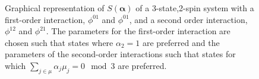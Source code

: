 \begin{figure}[h!]
\begin{subfigure}[b]{0.105\textwidth}
{}
    \end{subfigure}%
    \caption{Graphical representation of $S({\boldsymbol{\alpha}})$ of a 3-state,2-spin system with a first-order interaction, $\phi^{01}$ and $\phi^{01}$, and a second order interaction, $\phi^{12}$ and $\phi^{21}$. The parameters for the first-order interaction are chosen such that states where $\alpha_2 = 1$ are preferred and the parameters of the second-order interactions such that states for which  $\sum_{j \in \mu} \alpha_j \mu_j =  0\mod3$ are preferred.}
    \label{fig:s_case_2}
\end{figure}

